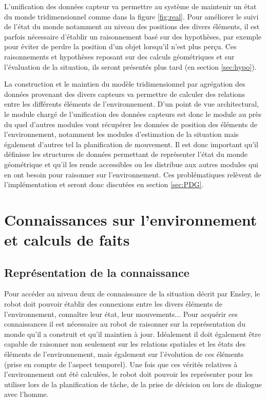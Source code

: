 \documentclass[a4paper,11pt,twoside]{StyleThese}
\begin{document}
L'unification des données capteur va permettre au système de maintenir un état du monde tridimensionnel comme dans la figure \ref{fig:real}. Pour améliorer le suivi de l'état du monde notamment au niveau des positions des divers éléments, il est parfois nécessaire d'établir un raisonnement basé sur des hypothèses, par exemple pour éviter de perdre la position d'un objet lorsqu'il n'est plus perçu. Ces raisonnements et hypothèses reposant sur des calculs géométriques et sur l'évaluation de la situation, ils seront présentés plus tard (en section \ref{sec:hypo}). 

La construction et le maintien du modèle tridimensionnel par agrégation des données provenant des divers capteurs va permettre de calculer des relations entre les différents éléments de l'environnement.
D'un point de vue architectural, le module chargé de l'unification des données capteurs est donc le module au près du quel d'autres modules vont récupérer les données de position des éléments de l'environnement, notamment les modules d'estimation de la situation mais également d'autres tel la planification de mouvement. Il est donc important qu'il définisse les structures de données permettant de représenter l'état du monde géométrique et qu'il les rende accessibles ou les distribue aux autres modules qui en ont besoin pour raisonner sur l'environnement. Ces problématiques relèvent de l'implémentation et seront donc discutées en section \ref{sec:PDG}.


\section{Connaissances sur l'environnement et calculs de faits}
\label{sec:calculs}
\subsection{Représentation de la connaissance}
\label{sec:facts}

Pour accéder au niveau deux de connaissance de la situation décrit par Ensley, le robot doit pouvoir établir des connexions entre les divers éléments de l'environnement, connaître leur état, leur mouvements... Pour acquérir ces connaissances il est nécessaire au robot de raisonner sur la représentation du monde qu'il a construit et qu'il maintien à jour. Idéalement il doit également être capable de raisonner non seulement sur les relations spatiales et les états des éléments de l'environnement, mais également sur l'évolution de ces éléments (prise en compte de l'aspect temporel). Une fois que ces vérités relatives à l'environnement ont été calculées, le robot doit pouvoir les représenter pour les utiliser lors de la planification de tâche, de la prise de décision ou lors de dialogue avec l'homme.
\end{document}
